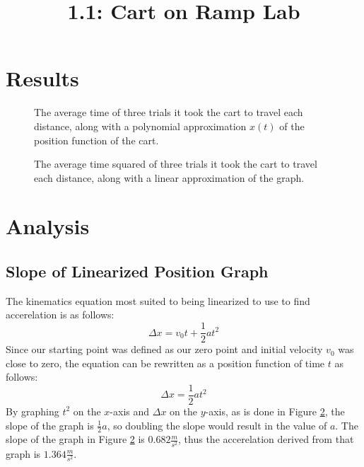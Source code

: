 \documentclass{article}
\title{1.1: Cart on Ramp Lab}
\begin{document}
\section{Results}
\begin{figure}[H]
    \centering
    \caption{The average time of three trials it took the cart to travel each distance, along with a polynomial approximation $x(t)$ of the position function of the cart.}
    \label{fig:polynomial}
\end{figure}

\begin{figure}[H]
    \centering
    \caption{The average time squared of three trials it took the cart to travel each distance, along with a linear approximation of the graph.}
    \label{fig:linear}
\end{figure}

\section{Analysis}
\subsection{Slope of Linearized Position Graph}
The kinematics equation most suited to being linearized to use to find accerelation is as follows:
\[\Delta x = v_0t + \frac{1}{2}at^2\]
Since our starting point was defined as our zero point and initial velocity $v_0$ was close to zero, the equation can be rewritten as a position function of time $t$ as follows:
\[\Delta x = \frac{1}{2}at^2\]
By graphing $t^2$ on the $x$-axis and $\Delta x$ on the $y$-axis, as is done in Figure \ref{fig:linear}, the slope of the graph is $\frac{1}{2}a$, so doubling the slope would result in the value of $a$. The slope of the graph in Figure \ref{fig:linear} is $0.682 \frac{m}{s ^ 2}$, thus the accerelation derived from that graph is $1.364 \frac{m}{s ^ 2}$.
\end{document}
